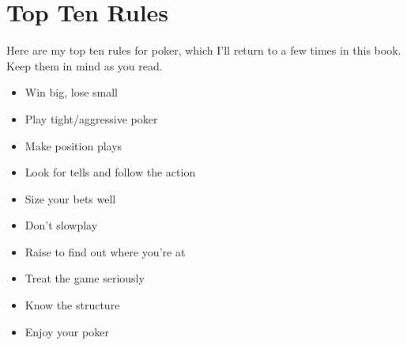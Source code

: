 \chapter{Top Ten Rules}


Here are my top ten rules for poker, which I'll return to
a few times in this book. Keep them in mind as you read.

\begin{itemize}
  \item Win big, lose small
  \item Play tight/aggressive poker
  \item Make position plays
  \item Look for tells and follow the action
  \item Size your bets well
  \item Don't slowplay
  \item Raise to find out where you're at
  \item Treat the game seriously
  \item Know the structure
  \item Enjoy your poker
\end{itemize}

